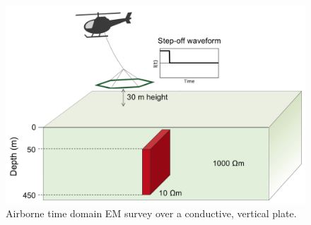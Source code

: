 \begin{figure}
    \begin{center}
    \includegraphics[width=0.8\columnwidth]{figures/plate-setup.png}
    \end{center}
\caption{
    Airborne time domain EM survey over a conductive, vertical plate.
}
\label{fig:plate-setup}
\end{figure}
